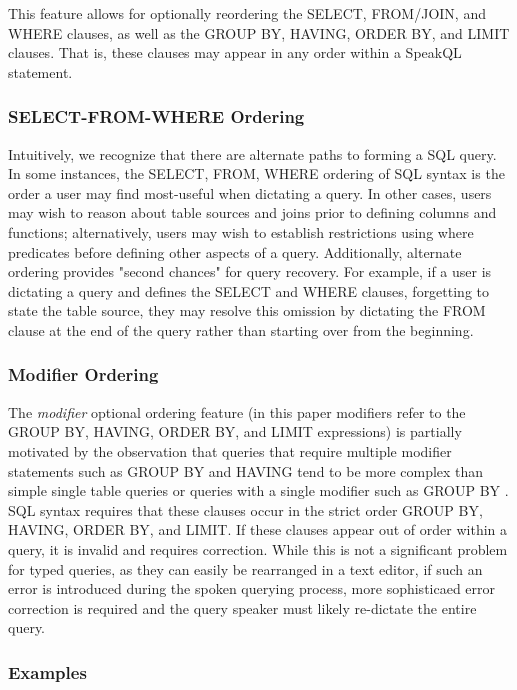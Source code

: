 This feature allows for optionally reordering the SELECT, FROM/JOIN, and WHERE clauses, as well as the GROUP BY, HAVING, ORDER BY, and LIMIT clauses. 
That is, these clauses may appear in any order within a SpeakQL statement. 

\subsubsection{\textbf{SELECT-FROM-WHERE Ordering}} 
Intuitively, we recognize that there are alternate paths to forming a SQL query. In some instances, the SELECT, FROM, WHERE ordering of SQL syntax is the order a user may find most-useful when dictating a query. In other cases, users may wish to reason about table sources and joins prior to defining columns and functions; alternatively, users may wish to establish restrictions using where predicates before defining other aspects of a query. Additionally, alternate ordering provides "second chances" for query recovery. For example, if a user is dictating a query and defines the SELECT and WHERE clauses, forgetting to state the table source, they may resolve this omission by dictating the FROM clause at the end of the query rather than starting over from the beginning.

\subsubsection{\textbf{Modifier Ordering}} 
The \emph{modifier}  optional ordering feature (in this paper modifiers refer to the GROUP BY, HAVING, ORDER BY, and LIMIT expressions) is partially motivated by the observation that queries that require multiple modifier statements such as GROUP BY and HAVING tend to be more complex than simple single table queries or queries with a single modifier such as GROUP BY \cite{10.1145/2729094.2742620}. SQL syntax requires that these clauses occur in the strict order GROUP BY, HAVING, ORDER BY, and LIMIT. If these clauses appear out of order within a query, it is invalid and requires correction. While this is not a significant problem for typed queries, as they can easily be rearranged in a text editor, if such an error is introduced during the spoken querying process, more sophisticaed error correction is required and the query speaker must likely re-dictate the entire query.




\subsubsection{\textbf{Examples}}

